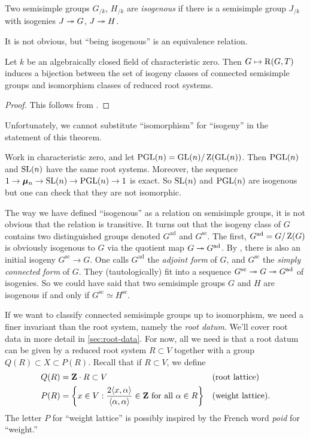 \begin{definition}
Two semisimple groups $G_{/k}$, $H_{/k}$ are \emph{isogenous} if there is a 
semisimple group $J_{/k}$ with isogenies $J\twoheadrightarrow G$, $J\twoheadrightarrow H$. 
\end{definition}

It is not obvious, but ``being isogenous'' is an equivalence relation. 

\begin{theorem}
Let $k$ be an algebraically closed field of characteristic zero. Then 
$G\mapsto \operatorname{R}(G,T)$ induces a bijection between the set of isogeny classes 
of connected semisimple groups and isomorphism classes of reduced root systems. 
\end{theorem}
\begin{proof}
This follows from \cite[23.14-15]{milne-iAG}. 
\end{proof}

Unfortunately, we cannot substitute ``isomorphism'' for ``isogeny'' in the 
statement of this theorem. 

\begin{example}
Work in characteristic zero, and let $\operatorname{PGL}(n)=\operatorname{GL}(n)/\operatorname{Z}(\operatorname{GL}(n))$. Then 
$\operatorname{PGL}(n)$ and $\operatorname{SL}(n)$ have the same root systems. Moreover, the sequence 
$1\to \bm{\mu}_n\to \operatorname{SL}(n)\to \operatorname{PGL}(n)\to 1$ is exact. So $\operatorname{SL}(n)$ and $\operatorname{PGL}(n)$ are 
isogenous but one can check that they are not isomorphic. 
\end{example}

The way we have defined ``isogenous'' as a relation on semisimple groups, it is 
not obvious that the relation is transitive. It turns out that the isogeny 
class of $G$ contains two distinguished groups denoted $G^\mathrm{ad}$ and 
$G^\mathrm{sc}$. The first, $G^\mathrm{ad}=G/\operatorname{Z}(G)$ is obviously 
isogenous to $G$ via the quotient map $G\twoheadrightarrow G^\mathrm{ad}$. By 
\cite[21.38]{milne-iAG}, there is also an initial isogeny $G^\mathrm{sc}\to G$. 
One calls $G^\mathrm{ad}$ the \emph{adjoint form} of $G$, and 
$G^\mathrm{sc}$ the \emph{simply connected form} of $G$. They (tautologically) 
fit into a sequence $G^\mathrm{sc}\twoheadrightarrow G\twoheadrightarrow G^\mathrm{ad}$ of isogenies. So 
we could have said that two semisimple groups $G$ and $H$ are isogenous if and 
only if $G^\mathrm{sc}\simeq H^\mathrm{sc}$. 

If we want to classify connected semisimple groups up to isomorphism, we need 
a finer invariant than the root system, namely the \emph{root datum}. We'll 
cover root data in more detail in \autoref{sec:root-data}. For now, all we 
need is that a root datum can be given by a reduced root system $R\subset V$ 
together with a group $Q(R)\subset X\subset P(R)$. Recall that if $R\subset V$, 
we define 
\begin{align*}
  Q(R) &= \mathbf{Z}\cdot R\subset V && \text{(root lattice)}\\
  P(R) &= \left\{x\in V:\frac{2\langle x,\alpha\rangle}{\langle\alpha,\alpha\rangle}\in \mathbf{Z}\text{ for all }\alpha\in R\right\} && \text{(weight lattice)} .
\end{align*}
The letter $P$ for ``weight lattice'' is possibly inspired by the French word 
\emph{poid} for ``weight.''

